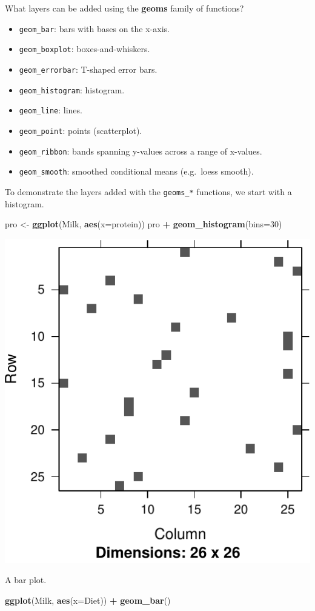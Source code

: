 \documentclass[]{book}
\newenvironment{Shaded}{\begin{snugshade}}{\end{snugshade}}
\newcommand{\DataTypeTok}[1]{\textcolor[rgb]{0.13,0.29,0.53}{#1}}
\newcommand{\DecValTok}[1]{\textcolor[rgb]{0.00,0.00,0.81}{#1}}
\newcommand{\KeywordTok}[1]{\textcolor[rgb]{0.13,0.29,0.53}{\textbf{#1}}}
\newcommand{\NormalTok}[1]{#1}
\newcommand{\OperatorTok}[1]{\textcolor[rgb]{0.81,0.36,0.00}{\textbf{#1}}}
\newcommand{\StringTok}[1]{\textcolor[rgb]{0.31,0.60,0.02}{#1}}
\providecommand{\tightlist}{%
  \setlength{\itemsep}{0pt}\setlength{\parskip}{0pt}}
\theoremstyle{definition}
\theoremstyle{definition}
\theoremstyle{definition}
\theoremstyle{remark}
\begin{document}
What layers can be added using the \textbf{geoms} family of functions?

\begin{itemize}
\tightlist
\item
  \texttt{geom\_bar}: bars with bases on the x-axis.
\item
  \texttt{geom\_boxplot}: boxes-and-whiskers.
\item
  \texttt{geom\_errorbar}: T-shaped error bars.
\item
  \texttt{geom\_histogram}: histogram.
\item
  \texttt{geom\_line}: lines.
\item
  \texttt{geom\_point}: points (scatterplot).
\item
  \texttt{geom\_ribbon}: bands spanning y-values across a range of x-values.
\item
  \texttt{geom\_smooth}: smoothed conditional means (e.g.~loess smooth).
\end{itemize}

To demonstrate the layers added with the \texttt{geoms\_*} functions, we start with a histogram.

\begin{Shaded}
\begin{Highlighting}[]
\NormalTok{pro <-}\StringTok{ }\KeywordTok{ggplot}\NormalTok{(Milk, }\KeywordTok{aes}\NormalTok{(}\DataTypeTok{x=}\NormalTok{protein))}
\NormalTok{pro }\OperatorTok{+}\StringTok{ }\KeywordTok{geom_histogram}\NormalTok{(}\DataTypeTok{bins=}\DecValTok{30}\NormalTok{)}
\end{Highlighting}
\end{Shaded}

\includegraphics[width=0.5\linewidth]{Rcourse_files/figure-latex/unnamed-chunk-281-1}

A bar plot.

\begin{Shaded}
\begin{Highlighting}[]
\KeywordTok{ggplot}\NormalTok{(Milk, }\KeywordTok{aes}\NormalTok{(}\DataTypeTok{x=}\NormalTok{Diet)) }\OperatorTok{+}
\StringTok{  }\KeywordTok{geom_bar}\NormalTok{()}
\end{Highlighting}
\end{Shaded}
\end{document}
